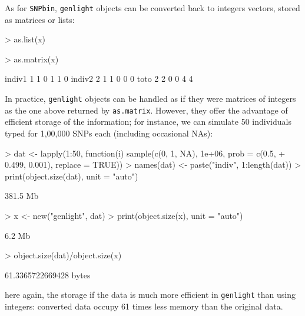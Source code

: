 \documentclass{article}
\begin{document}
As for \texttt{SNPbin}, \texttt{genlight} objects can be converted back to integers vectors, stored
as matrices or lists:
\begin{Schunk}
\begin{Sinput}
> as.list(x)
\end{Sinput}
\begin{Sinput}
> as.matrix(x)
\end{Sinput}
\begin{Soutput}
       [,1] [,2] [,3] [,4] [,5] [,6]
indiv1    1    1    0    1    1    0
indiv2    2    1    1    0    0    0
toto      2    2    0    0    4    4
\end{Soutput}
\end{Schunk}

\noindent In practice, \texttt{genlight} objects can be handled as if they were matrices of integers
as the one above returned by \texttt{as.matrix}.
However, they offer the advantage of efficient storage of the information; for instance, we can
simulate 50 individuals typed for 1,00,000 SNPs each (including occasional NAs):
\begin{Schunk}
\begin{Sinput}
> dat <- lapply(1:50, function(i) sample(c(0, 1, NA), 1e+06, prob = c(0.5, 
+     0.499, 0.001), replace = TRUE))
> names(dat) <- paste("indiv", 1:length(dat))
> print(object.size(dat), unit = "auto")
\end{Sinput}
\begin{Soutput}
381.5 Mb
\end{Soutput}
\begin{Sinput}
> x <- new("genlight", dat)
> print(object.size(x), unit = "auto")
\end{Sinput}
\begin{Soutput}
6.2 Mb
\end{Soutput}
\begin{Sinput}
> object.size(dat)/object.size(x)
\end{Sinput}
\begin{Soutput}
61.3365722669428 bytes
\end{Soutput}
\end{Schunk}
here again, the storage if the data is much more efficient in \texttt{genlight} than using integers: converted data occupy
61 times less memory than the original data.
\\
\end{document}

